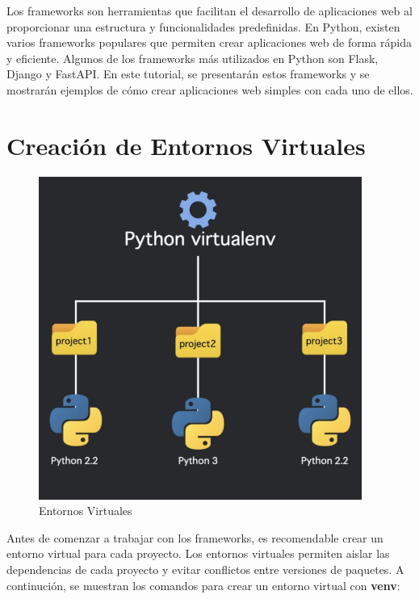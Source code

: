 \documentclass[
  a4paper,
  DIV=11,
  numbers=noendperiod,
  onepage,
  openany]{scrreprt}
\begin{document}
Los frameworks son herramientas que facilitan el desarrollo de
aplicaciones web al proporcionar una estructura y funcionalidades
predefinidas. En Python, existen varios frameworks populares que
permiten crear aplicaciones web de forma rápida y eficiente. Algunos de
los frameworks más utilizados en Python son Flask, Django y FastAPI. En
este tutorial, se presentarán estos frameworks y se mostrarán ejemplos
de cómo crear aplicaciones web simples con cada uno de ellos.

\section{Creación de Entornos
Virtuales}\label{creaciuxf3n-de-entornos-virtuales}

\begin{figure}[H]

{\centering \includegraphics[width=4.16667in,height=\textheight,keepaspectratio]{unidades/unidad7/./images/venv.png}

}

\caption{Entornos Virtuales}

\end{figure}%

Antes de comenzar a trabajar con los frameworks, es recomendable crear
un entorno virtual para cada proyecto. Los entornos virtuales permiten
aislar las dependencias de cada proyecto y evitar conflictos entre
versiones de paquetes. A continución, se muestran los comandos para
crear un entorno virtual con \textbf{venv}:
\end{document}

